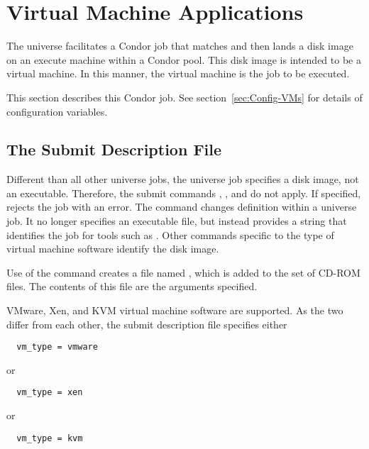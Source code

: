 \section{\label{sec:vmuniverse}Virtual Machine Applications}

The  universe facilitates a Condor job
that matches and then lands a disk image on an execute machine
within a Condor pool.
This disk image is intended to be a virtual machine.
In this manner, the virtual machine is the job to be executed.

This section describes this Condor job.
See section~\ref{sec:Config-VMs}
for details of configuration variables.

\subsection{\label{sec:vm-submitfile}The Submit Description File}

Different than all other universe jobs,
the  universe job specifies a disk image,
not an executable.
Therefore, the submit commands , ,
and  do not apply.
If specified,  rejects the job with an error.
The  command changes definition within a
 universe job.
It no longer specifies an executable file, but instead
provides a string that identifies the job for tools such
as .
Other commands specific to the type of virtual machine software
identify the disk image.

Use of the  command creates a file named ,
which is added to the set of CD-ROM files.
The contents of this file are the arguments specified.

VMware, Xen, and KVM virtual machine software are supported.
As the two differ from each other, the submit description file
specifies either
\begin{verbatim}
  vm_type = vmware
\end{verbatim}
or
\begin{verbatim}
  vm_type = xen
\end{verbatim}
or
\begin{verbatim}
  vm_type = kvm
\end{verbatim}

